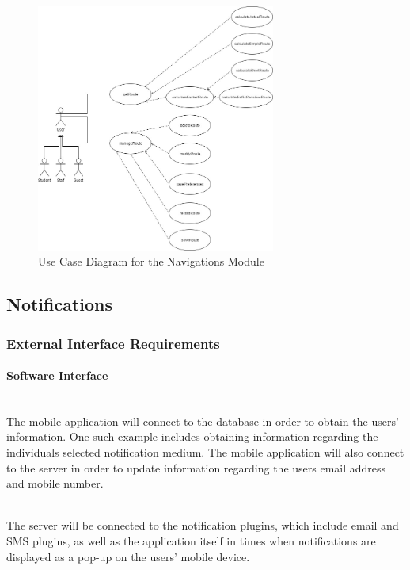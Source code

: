 \documentclass[runningheads,a4paper]{article}
\begin{document}
\begin{figure}[H]
   	\centering
   	\includegraphics[width=0.7\textwidth]{Navigation-Module-Use-Case.jpg}
   	\caption{Use Case Diagram for the Navigations Module}
\end{figure}


\subsection {Notifications}



\subsubsection{External Interface Requirements}



\paragraph{Software Interface}
\mbox{}\\
The mobile application will connect to the database in order to obtain the users’ information. One such example includes obtaining information regarding the individuals selected notification medium. The mobile application will also connect to the server in order to update information regarding the users email address and mobile number.

\mbox{}\\
The server will be connected to the notification plugins, which include email and SMS plugins, as well as the application itself in times when notifications are displayed as a pop-up on the users’ mobile device.
\end{document}
